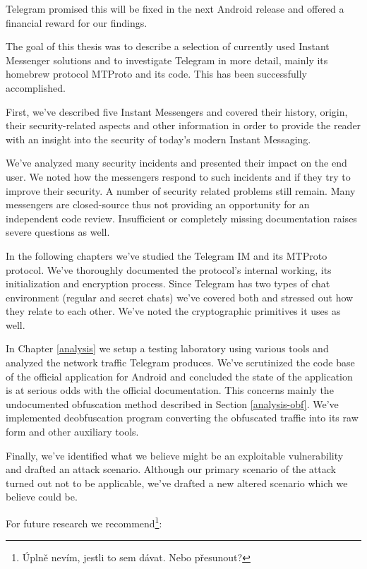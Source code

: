 \documentclass[thesis=M,english]{FITthesis}[2012/10/20]
\begin{document}
Telegram promised this will be fixed in the next Android release and offered a financial reward for our findings.




\begin{conclusion}

The goal of this thesis was to describe a selection of currently used Instant Messenger solutions and to investigate Telegram in more detail, mainly its homebrew protocol MTProto and its code. This has been successfully accomplished.

First, we've described five Instant Messengers and covered their history, origin, their security-related aspects and other information in order to provide the reader with an insight into the security of today's modern Instant Messaging.

We've analyzed many security incidents and presented their impact on the end user. We noted how the messengers respond to such incidents and if they try to improve their security. A number of security related problems still remain. Many messengers are closed-source thus not providing an opportunity for an independent code review. Insufficient or completely missing documentation raises severe questions as well.

In the following chapters we've studied the Telegram IM and its MTProto protocol. We've thoroughly documented the protocol's internal working, its initialization and encryption process. Since Telegram has two types of chat environment (regular and secret chats) we've covered both and stressed out how they relate to each other. We've noted the cryptographic primitives it uses as well.

In Chapter \ref{analysis} we setup a testing laboratory using various tools and analyzed the network traffic Telegram produces. We've scrutinized the code base of the official application for Android and concluded the state of the application is at serious odds with the official documentation. This concerns mainly the undocumented obfuscation method described in Section \ref{analysis-obf}. We've implemented deobfuscation program converting the obfuscated traffic into its raw form and other auxiliary tools.

Finally, we've identified what we believe might be an exploitable vulnerability and drafted an attack scenario. Although our primary scenario of the attack turned out not to be applicable, we've drafted a new altered scenario which we believe could be.

For future research we recommend\footnote{Úplně nevím, jestli to sem dávat. Nebo přesunout?}:


\end{conclusion}
\end{document}
